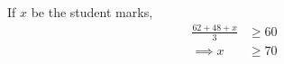 If $x$ be the student marks, 
\begin{align}
 \frac{62 +48 +  x }{3} &\geq 60
\\
\implies x &\geq 70
\end{align}
